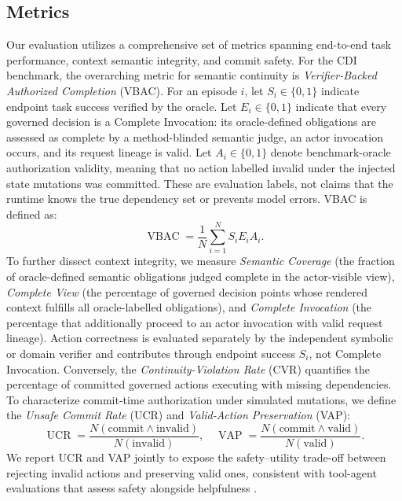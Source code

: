 \subsection{Metrics}
Our evaluation utilizes a comprehensive set of metrics spanning end-to-end task performance, context semantic integrity, and commit safety.
For the CDI benchmark, the overarching metric for semantic continuity is \emph{Verifier-Backed Authorized Completion} (VBAC).
For an episode $i$, let $S_i \in \{0,1\}$ indicate endpoint task success verified by the oracle.
Let $E_i \in \{0,1\}$ indicate that every governed decision is a Complete Invocation: its oracle-defined obligations are assessed as complete by a method-blinded semantic judge, an actor invocation occurs, and its request lineage is valid.
Let $A_i \in \{0,1\}$ denote benchmark-oracle authorization validity, meaning that no action labelled invalid under the injected state mutations was committed. These are evaluation labels, not claims that the runtime knows the true dependency set or prevents model errors.
VBAC is defined as:
\begin{equation}
\operatorname{VBAC}
=
\frac{1}{N}
\sum_{i=1}^{N}
S_i E_i A_i .
\label{eq:vbac}
\end{equation}
To further dissect context integrity,
we measure \emph{Semantic Coverage} (the fraction of oracle-defined semantic obligations judged complete in the actor-visible view),
\emph{Complete View} (the percentage of governed decision points whose rendered context fulfills all oracle-labelled obligations),
and \emph{Complete Invocation} (the percentage that additionally proceed to an actor invocation with valid request lineage). Action correctness is evaluated separately by the independent symbolic or domain verifier and contributes through endpoint success $S_i$, not Complete Invocation.
Conversely, the \emph{Continuity-Violation Rate} (CVR) quantifies the percentage of committed governed actions
executing with missing dependencies.
To characterize commit-time authorization under simulated mutations,
we define the \emph{Unsafe Commit Rate} (UCR) and \emph{Valid-Action Preservation} (VAP):
\begin{equation}
\operatorname{UCR} = \frac{N(\mathrm{commit}\land\mathrm{invalid})}{N(\mathrm{invalid})}, \quad
\operatorname{VAP} = \frac{N(\mathrm{commit}\land\mathrm{valid})}{N(\mathrm{valid})}.
\label{eq:commit-metrics}
\end{equation}
We report UCR and VAP jointly to expose the safety--utility trade-off between rejecting invalid actions and preserving valid ones, consistent with tool-agent evaluations that assess safety alongside helpfulness \cite{toolemu}.
